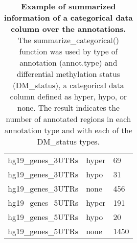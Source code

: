 \begin{table}[!ht]
\begin{tabular}{lll}
hg19\_genes\_3UTRs              & hyper               & 69         \\
hg19\_genes\_3UTRs              & hypo                & 31         \\
hg19\_genes\_3UTRs              & none                & 456        \\
hg19\_genes\_5UTRs              & hyper               & 191        \\
hg19\_genes\_5UTRs              & hypo                & 20         \\
hg19\_genes\_5UTRs              & none                & 1450
\end{tabular}
\normalsize
\caption[Power comparisons for Broad-Enrich versus Fisher's exact test]
{
\textbf{Example of summarized information of a categorical data column over the annotations.}
The summarize\_categorical() function was used by type of annotation (annot.type) and differential methylation status (DM\_status), a categorical data column defined as hyper, hypo, or none. The result indicates the number of annotated regions in each annotation type and with each of the DM\_status types.
}
\label{chap4:table:5}

\end{table}

\newpage

